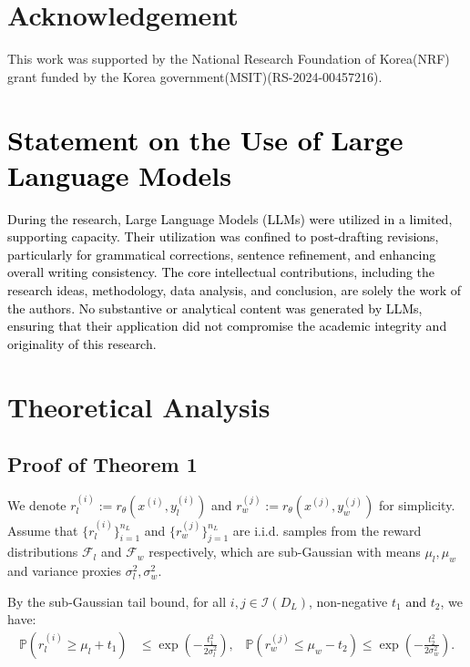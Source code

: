 \documentclass{article} %
\newcommand\fix[1]{\textcolor{black}{#1}}
\newcommand\turnitin[1]{\textcolor{black}{#1}}
\begin{document}
\section*{Acknowledgement}

This work was supported by the National Research Foundation of Korea(NRF) grant funded by the Korea government(MSIT)(RS-2024-00457216).





\clearpage
\appendix

\section{\fix{Statement on the Use of Large Language Models}}
\fix{During the research, Large Language Models (LLMs) were utilized in a limited, supporting capacity. \turnitin{Their utilization was confined to post-drafting revisions, particularly for grammatical corrections, sentence refinement, and enhancing overall writing consistency.} The core intellectual contributions, including the research ideas, methodology, data analysis, and conclusion, are solely the work of the authors. No substantive or analytical content was generated by LLMs, ensuring that their application did not compromise the academic integrity and originality of this research.}

\section{Theoretical Analysis}
\label{appendix:proofs}
\bigskip
\subsection{Proof of Theorem 1}
\label{appendix:proof-theorem_1}

We denote $r_l^{(i)} := r_\theta(x^{(i)},y_l^{(i)})$ and $r_w^{(j)} := r_\theta(x^{(j)},y_w^{(j)})$ for simplicity. Assume that \(\{ r_l^{(i)}\}_{i=1}^{n_L}\) and \(\{ r_w^{(j)}\}_{j=1}^{n_L} \) are i.i.d. samples from the reward distributions $\mathcal{F}_l$ and $\mathcal{F}_w$ respectively, which are sub-Gaussian with means $\mu_l, \mu_w$ and variance proxies $\sigma_l^2, \sigma_w^2$.

By the sub-Gaussian tail bound, for all $i,j \in \mathcal{I}(D_L)$, non-negative $t_1$ \fix{and} $t_2$, we have:
\begin{align*}
    \mathbb{P} \left( r_l^{(i)} \geq \mu_l + t_1 \right) &\leq \exp\left( -\frac{t_1^2}{2\sigma_l^2} \right), \;\;\; \mathbb{P} \left( r_w^{(j)} \leq \mu_w - t_2 \right) \leq \exp\left( -\frac{t_2^2}{2\sigma_w^2} \right).
\end{align*}
\end{document}
